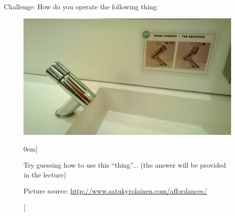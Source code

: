 Challenge: How do you operate the following thing:
\begin{figure}%
  \includegraphics[width=\textwidth]{../figures/faucet-with-false-affrodance.jpg}
  \caption[][0em]{Try guessing how to use this ``thing''... (the answer will be provided in the lecture) \par Picture source: \url{http://www.satukyrolainen.com/affordances/}}
  \label{fig:faucet}
\end{figure}





